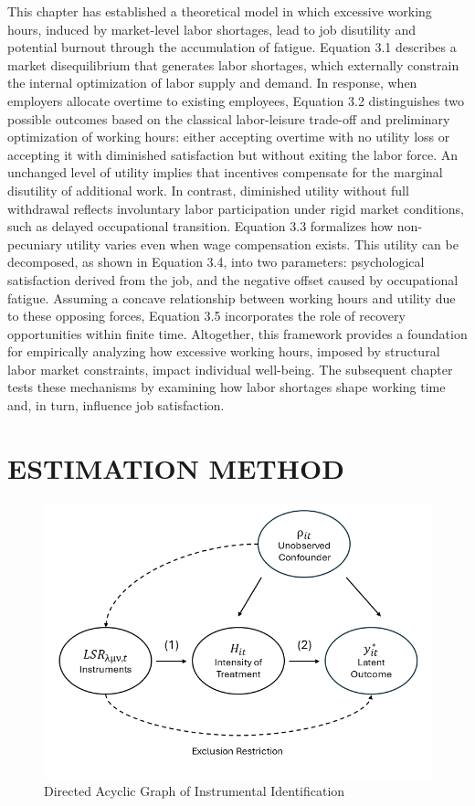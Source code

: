 \documentclass[
  12pt,
]{article}
\begin{document}
This chapter has established a theoretical model in which excessive
working hours, induced by market-level labor shortages, lead to job
disutility and potential burnout through the accumulation of fatigue.
Equation 3.1 describes a market disequilibrium that generates labor
shortages, which externally constrain the internal optimization of labor
supply and demand. In response, when employers allocate overtime to
existing employees, Equation 3.2 distinguishes two possible outcomes
based on the classical labor-leisure trade-off and preliminary
optimization of working hours: either accepting overtime with no utility
loss or accepting it with diminished satisfaction but without exiting
the labor force. An unchanged level of utility implies that incentives
compensate for the marginal disutility of additional work. In contrast,
diminished utility without full withdrawal reflects involuntary labor
participation under rigid market conditions, such as delayed
occupational transition. Equation 3.3 formalizes how non-pecuniary
utility varies even when wage compensation exists. This utility can be
decomposed, as shown in Equation 3.4, into two parameters: psychological
satisfaction derived from the job, and the negative offset caused by
occupational fatigue. Assuming a concave relationship between working
hours and utility due to these opposing forces, Equation 3.5
incorporates the role of recovery opportunities within finite time.
Altogether, this framework provides a foundation for empirically
analyzing how excessive working hours, imposed by structural labor
market constraints, impact individual well-being. The subsequent chapter
tests these mechanisms by examining how labor shortages shape working
time and, in turn, influence job satisfaction.

\newpage

\section{ESTIMATION METHOD}\label{estimation-method}

\begin{figure}
\centering
\includegraphics[width=5.20833in,height=\textheight,keepaspectratio]{DAG.png}
\caption{Directed Acyclic Graph of Instrumental Identification}
\end{figure}
\end{document}

